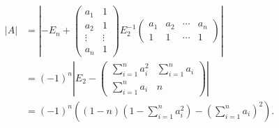 \begin{enumerate}
\begin{solution}
              \begin{align*}
                  |A| & = \left\vert-E_n +
                  \begin{pmatrix}
                      a_1 & 1 \\ a_2 & 1 \\ \vdots & \vdots \\ a_n & 1
                  \end{pmatrix} E_2^{-1}
                  \begin{pmatrix}
                      a_1 & a_2 & \cdots & a_n \\ 1 & 1 & \cdots & 1
                  \end{pmatrix}\right\vert                                                                       \\
                      & = (-1)^n \left|E_2 -
                  \begin{pmatrix}
                      \sum\limits_{i=1}^n a_i^2 & \sum\limits_{i=1}^n a_i \\[2ex]
                      \sum\limits_{i=1}^n a_i   & n
                  \end{pmatrix}\right|                                                          \\
                      & = (-1)^n \left((1-n)\left(1-\sum\limits_{i=1}^n a_i^2\right) - \left(\sum\limits_{i=1}^n a_i\right)^2\right).
              \end{align*}
          \end{solution}


\end{enumerate}
